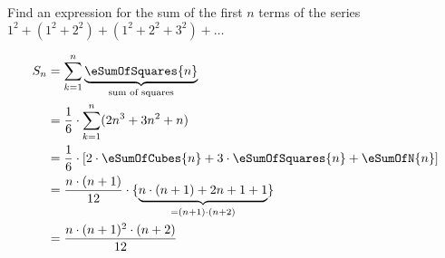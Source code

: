 
%
%
%
%
% 
% 

\question[3] Find an expression for the sum of the first $n$ terms of the series 
$1^2 + (1^2+2^2) + (1^2+2^2+3^2) + \ldots$


\ifprintanswers
\fi 

\begin{solution}[\halfpage]
	\begin{align}
		S_n &= \sum_{k=1}^{n}\underbrace{\eSumOfSquares{n}}_{\text{sum of squares}} \\
		&= \dfrac{1}{6}\cdot\sum_{k=1}^{n}(2n^3+3n^2+n) \\
		&= \dfrac{1}{6}\cdot\left[ 2\cdot\eSumOfCubes{n} + 3\cdot\eSumOfSquares{n} + \eSumOfN{n}\right] \\
		&= \dfrac{n\cdot(n+1)}{12}\cdot\lbrace\underbrace{n\cdot(n+1) + 2n + 1 + 1}_{=(n+1)\cdot(n+2)}\rbrace \\
		&= \dfrac{n\cdot(n+1)^2\cdot(n+2)}{12}
	\end{align}
\end{solution}
